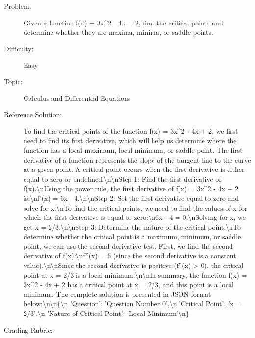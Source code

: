 \documentclass{article}%
\begin{document}
\begin{description}%
\item[Problem: ]%
Given a function f(x) = 3x\^{}2 {-} 4x + 2, find the critical points and determine whether they are maxima, minima, or saddle points.%
\item[Difficulty: ]%
Easy%
\item[Topic: ]%
Calculus and Differential Equations%
\item[Reference Solution: ]%
To find the critical points of the function f(x) = 3x\^{}2 {-} 4x + 2, we first need to find its first derivative, which will help us determine where the function has a local maximum, local minimum, or saddle point. The first derivative of a function represents the slope of the tangent line to the curve at a given point. A critical point occurs when the first derivative is either equal to zero or undefined.\textbackslash{}n\textbackslash{}nStep 1: Find the first derivative of f(x).\textbackslash{}nUsing the power rule, the first derivative of f(x) = 3x\^{}2 {-} 4x + 2 is:\textbackslash{}nf'(x) = 6x {-} 4.\textbackslash{}n\textbackslash{}nStep 2: Set the first derivative equal to zero and solve for x.\textbackslash{}nTo find the critical points, we need to find the values of x for which the first derivative is equal to zero:\textbackslash{}n6x {-} 4 = 0.\textbackslash{}nSolving for x, we get x = 2/3.\textbackslash{}n\textbackslash{}nStep 3: Determine the nature of the critical point.\textbackslash{}nTo determine whether the critical point is a maximum, minimum, or saddle point, we can use the second derivative test. First, we find the second derivative of f(x):\textbackslash{}nf''(x) = 6 (since the second derivative is a constant value).\textbackslash{}n\textbackslash{}nSince the second derivative is positive (f''(x) > 0), the critical point at x = 2/3 is a local minimum.\textbackslash{}n\textbackslash{}nIn summary, the function f(x) = 3x\^{}2 {-} 4x + 2 has a critical point at x = 2/3, and this point is a local minimum. The complete solution is presented in JSON format below:\textbackslash{}n\textbackslash{}n\{\textbackslash{}n    'Question': 'Question Number 0',\textbackslash{}n    'Critical Point': 'x = 2/3',\textbackslash{}n    'Nature of Critical Point': 'Local Minimum'\textbackslash{}n\}%
\item[Grading Rubric: ]%

\end{description}
\end{document}
